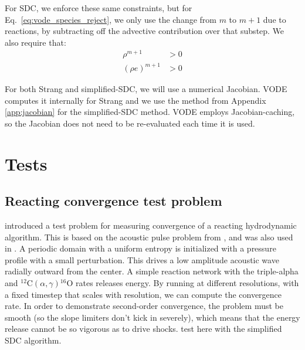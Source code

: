 \documentclass{aastex63}
\newcommand{\isotm}[2]{{}^{#2}\mathrm{#1}}
\begin{document}
For SDC, we enforce these same constraints, but for
Eq.~\ref{eq:vode_species_reject}, we only use the change from $m$ to
$m+1$ due to reactions, by subtracting off the advective contribution
over that substep.  We also require that:
\begin{align}
\rho^{m+1} &> 0 \\
(\rho e)^{m+1} &> 0
\end{align}

For both Strang and simplified-SDC, we will use a numerical Jacobian.
VODE computes it internally for Strang and we use the method from
Appendix \ref{app:jacobian} for the simplified-SDC method.  VODE
employs Jacobian-caching, so the Jacobian does not need to be
re-evaluated each time it is used.


\section{Tests}

\subsection{Reacting convergence test problem}

\cite{castro_sdc} introduced a test problem for measuring convergence
of a reacting hydrodynamic algorithm.  This is based on the acoustic
pulse problem from \citep{mccorquodalecolella}, and was also used in
\citep{strang_rnaas}.  A periodic domain with a uniform entropy is
initialized with a pressure profile with a small perturbation.  This
drives a low amplitude acoustic wave radially outward from the center.
A simple reaction network with the triple-alpha and
$\isotm{C}{12}(\alpha,\gamma)\isotm{O}{16}$ rates releases energy.  By
running at different resolutions, with a fixed timestep that scales
with resolution, we can compute the convergence rate.  In order to
demonstrate second-order convergence, the problem must be smooth (so
the slope limiters don't kick in severely), which means that the
energy release cannot be so vigorous as to drive shocks.  test here
with the simplified SDC algorithm.




\end{document}
